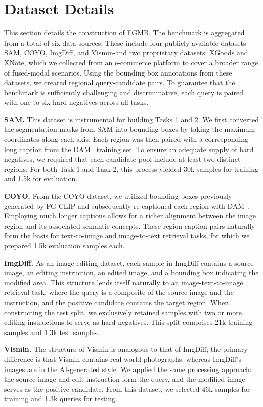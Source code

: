 \section{Dataset Details}
\label{sec:app-dataset}

This section details the construction of FGMB. The benchmark is aggregated from a total of six data sources. These include four publicly available datasets-SAM, COYO, ImgDiff, and Vismin-and two proprietary datasets: XGoods and XNote, which we collected from an e-commerce platform to cover a broader range of fused-modal scenarios. Using the bounding box annotations from these datasets, we created regional query-candidate pairs. To guarantee that the benchmark is sufficiently challenging and discriminative, each query is paired with one to six hard negatives across all tasks.

\textbf{SAM.} This dataset is instrumental for building Tasks 1 and 2. We first converted the segmentation masks from SAM into bounding boxes by taking the maximum coordinates along each axis. Each region was then paired with a corresponding long caption from the DAM~\cite{lian2025dam} training set. To ensure an adequate supply of hard negatives, we required that each candidate pool include at least two distinct regions. For both Task 1 and Task 2, this process yielded 30k samples for training and 1.5k for evaluation.

\textbf{COYO.} From the COYO dataset, we utilized bounding boxes previously generated by FG-CLIP and subsequently re-captioned each region with DAM~\cite{lian2025dam}. Employing much longer captions allows for a richer alignment between the image region and its associated semantic concepts. These region-caption pairs naturally form the basis for text-to-image and image-to-text retrieval tasks, for which we prepared 1.5k evaluation samples each.

\textbf{ImgDiff.} As an image editing dataset, each sample in ImgDiff contains a source image, an editing instruction, an edited image, and a bounding box indicating the modified area. This structure lends itself naturally to an image-text-to-image retrieval task, where the query is a composite of the source image and the instruction, and the positive candidate contains the target region. When constructing the test split, we exclusively retained samples with two or more editing instructions to serve as hard negatives. This split comprises 21k training samples and 1.3k test samples.


\textbf{Vismin.} The structure of Vismin is analogous to that of ImgDiff; the primary difference is that Vismin contains real-world photographs, whereas ImgDiff's images are in the AI-generated style. We applied the same processing approach: the source image and edit instruction form the query, and the modified image serves as the positive candidate. From this dataset, we selected 46k samples for training and 1.3k queries for testing.

